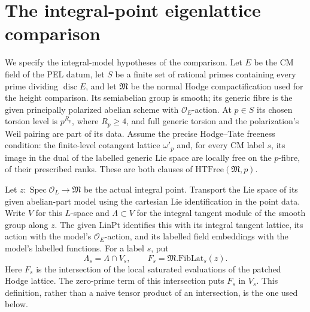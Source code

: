 \section{The integral-point eigenlattice comparison}
\label{sec:sr-integral-eigenlattice-comparison}

We specify the integral-model hypotheses of the comparison.
Let \(E\) be the CM field of the PEL datum, let \(S\)
be a finite set of rational primes containing every prime
dividing \(\operatorname{disc}E\), and let
\(\mathfrak M\) be the normal Hodge compactification used
for the height comparison. Its semiabelian group is smooth;
its generic fibre is the given principally polarized
abelian scheme with \(\mathcal O_E\)-action.
At \(p\in S\) its chosen torsion level is \(p^{R_p}\),
where \(R_p\ge4\), and full generic torsion and the
polarization's Weil pairing are part of its data.
Assume the precise Hodge--Tate freeness condition:
the finite-level cotangent lattice \(\omega'_p\)
and, for every CM label \(s\), its image in the dual
of the labelled generic Lie space are locally free
on the \(p\)-fibre, of their prescribed ranks.
These are both clauses of \(\mathrm{HTFree}(\mathfrak M,p)\).

Let \(z:\operatorname{Spec}\mathcal O_L\to\mathfrak M\)
be the actual integral point.
Transport the Lie space of its given abelian-part model
using the cartesian Lie identification in the point data.
Write \(V\) for this \(L\)-space and
\(\Lambda\subset V\) for the integral tangent module
of the smooth group along \(z\).
The given \(\mathrm{LinPt}\) identifies this with its
integral tangent lattice, its action with the model's
\(\mathcal O_E\)-action, and its labelled field embeddings
with the model's labelled functions.
For a label \(s\), put
\[
 \Lambda_s=\Lambda\cap V_s,\qquad
 F_s=\mathfrak M.\mathrm{FibLat}_s(z).
 \tag{IC1}
\]
Here \(F_s\) is the intersection of the local saturated
evaluations of the patched Hodge lattice. The zero-prime term of this intersection puts \(F_s\)
in \(V_s\).
This definition, rather than a naive tensor product
of an intersection, is the one used below.


